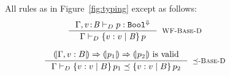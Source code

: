 \begin{figure}[t!]
\centering
\captionsetup{justification=centering}

All rules as in Figure~\ref{fig:typing} except as follows: \\

$$
\inference{
	\dechastype{\Gamma, \tbind{v}{\Base}}{\restrictdecidable{p}{r}}{\FinTy{\tbool}}
}{
	\deciswellformed{\Gamma}{\tref{v}{\Base}{}{\restrictdecidable{p}{r}}}
}[\rwbased]
$$


$$
\inference{
  \VCOND{\Env, v:B}{p_1}{p_2}\ \mbox{is valid}
}{
	\decissubtype{\Gamma}
		{\tref{v}{B}{}{\restrictdecidable{p_1}{e_1}}}
		{\tref{v}{B}{}{\restrictdecidable{p_2}{e_2}}}
}[\rsubbased]
\samerule{\qquad
\inference{
	\decissubtype{\Gamma}{\tau'_x}{\tau_x} &&
	\decissubtype{\Gamma, x \colon \tau'_x}{\tau}{\tau'}
}{
	\decissubtype{\Gamma}{\tfunref{x}{\tau_x}{\tau}{v}{e_1}}{\tfunref{x}{\tau'_x}{\tau'}{v}{e_2}}
}[\rsubfun]
}$$

\end{figure}
